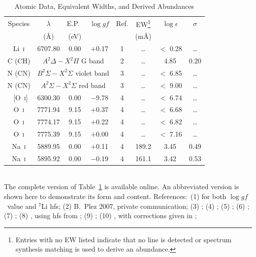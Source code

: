 \documentclass[useAMS,usenatbib,usegraphicx]{mn2e}
\def\loggf{$\log gf$}
\begin{document}
\begin{table}
\begin{minipage}{\textwidth}
\caption{Atomic Data, Equivalent Widths, and Derived Abundances
\label{atomictab}}
\begin{tabular}{cccccccc}
\hline
Species &
$\lambda$ &
E.P.\ &
$\log gf$ &
Ref. &
EW\footnote{Entries with no EW listed indicate that
no line is detected or
spectrum synthesis matching is used to derive an abundance.} &
$\log \epsilon$ &
$\sigma$ \\
  & 
 (\AA) &
 (eV) & 
  & 
  & 
 (m\AA) &
  &
  \\
\hline
    Li~\textsc{i}  & 6707.80 & 0.00 & $+$0.17 &  1 & \ldots  & $<$ 0.28 & \ldots  \\
C (CH) & \multicolumn{3}{c}{$A^2\Delta - X^2\Pi$ G band}        &  2 & \ldots  &     4.85 &   0.20  \\
N (CN) & \multicolumn{3}{c}{$B^2\Sigma - X^2\Sigma$ violet band}&  3 & \ldots  & $<$ 6.85 & \ldots  \\
N (CN) & \multicolumn{3}{c}{$A^2\Sigma - X^2\Sigma$ red band}   &  3 & \ldots  & $<$ 9.00 & \ldots  \\
  ~[O~\textsc{i}]  & 6300.30 & 0.00 & $-$9.78 &  4 & \ldots  & $<$ 6.74 & \ldots  \\
     O~\textsc{i}  & 7771.94 & 9.15 & $+$0.37 &  4 & \ldots  & $<$ 6.68 & \ldots  \\
     O~\textsc{i}  & 7774.17 & 9.15 & $+$0.22 &  4 & \ldots  & $<$ 6.82 & \ldots  \\
     O~\textsc{i}  & 7775.39 & 9.15 & $+$0.00 &  4 & \ldots  & $<$ 7.16 & \ldots  \\
    Na~\textsc{i}  & 5889.95 & 0.00 & $+$0.11 &  4 &  189.2  &     3.45 &    0.49 \\
    Na~\textsc{i}  & 5895.92 & 0.00 & $-$0.19 &  4 &  161.1  &     3.42 &    0.53 \\
\hline
\end{tabular}
\\
The complete version of Table~\ref{atomictab} is 
available online.
An abbreviated version is shown here to demonstrate its form and content.
References:\ 
 (1) \citealt{smith98} for both \loggf\ value and $^{7}$Li hfs;
 (2) B.\ Plez 2007, private communication;
 (3) \citealt{kurucz95};
 (4) \citealt{fuhr09};
 (5) \citealt{chang90};
 (6) \citealt{aldenius07};
 (7) \citealt{aldenius09};
 (8) \citealt{lawler89}, using hfs from \citealt{kurucz95};
 (9) \citealt{lawler13};
(10) \citealt{pickering01}, with corrections given in \citealt{pickering02};

\end{minipage}
\end{table}
\end{document}
